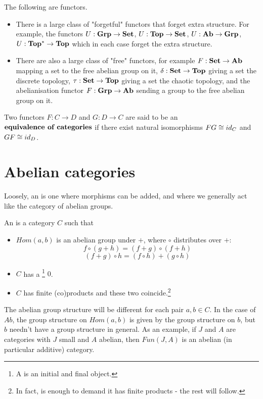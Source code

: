 \begin{example}[Functors] The following are functors.
\begin{itemize}
    \item There is a large class of "forgetful" functors that forget extra structure. For example, the functors $U:{\mathbf{Grp}}\rightarrow {\mathbf{Set}}$, $U:{\mathbf{Top}}\rightarrow {\mathbf{Set}}$, $U:{\mathbf{Ab}}\rightarrow {\mathbf{Grp}}$, $U:{\mathbf{Top^*}}\rightarrow {\mathbf{Top}}$ which in each case forget the extra structure.
    \item There are also a large class of "free" functors, for example $F:{\mathbf{Set}}\rightarrow {\mathbf{Ab}}$ mapping a set to the free abelian group on it, $\delta:{\mathbf{Set}}\rightarrow {\mathbf{Top}}$ giving a set the discrete topology, $\tau:{\mathbf{Set}}\rightarrow {\mathbf{Top}}$ giving a set the chaotic topology, and the abelianisation functor $F:{\mathbf{Grp}}\rightarrow {\mathbf{Ab}}$ sending a group to the free abelian group on it.
\end{itemize}
\end{example}

\begin{definition}
Two functors $F:C\rightarrow D$ and $G:D\rightarrow C$ are said to be an $\textbf{equivalence of categories}$ if there exist natural isomorphisms $FG\cong id_C$ and $GF\cong id_D$.
\end{definition}

\section{Abelian categories}
Loosely, an  is one where morphisms can be added, and where we generally act like the category of abelian groups. 
\begin{definition}
An  is a category $C$ such that 
\begin{itemize}
    \item $Hom(a,b)$ is an abelian group under $+$, where $\circ$ distributes over $+$:
    $$f\circ (g+h)=(f+g)\circ (f+h)$$
    $$(f+g)\circ h=(f\circ h)+(g\circ h)$$
    \item $C$ has a \footnote{A  is an initial and final object.} $0$.
    \item $C$ has finite (co)products and these two coincide.\footnote{In fact, is enough to demand it has finite products - the rest will follow.}
\end{itemize}
\end{definition}
The abelian group structure will be different for each pair $a,b\in C$. In the case of $Ab$, the group structure on $Hom(a,b)$ is given by the group structure on $b$, but $b$ needn't have a group structure in general. As an example, if $J$ and $A$ are categories with $J$ small and $A$ abelian, then $Fun(J,A)$ is an abelian (in particular additive) category.

